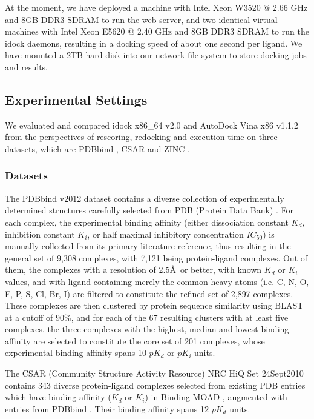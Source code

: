 \documentclass[10pt]{article}
\begin{document}
At the moment, we have deployed a machine with Intel Xeon W3520 @ 2.66 GHz and 8GB DDR3 SDRAM to run the web server, and two identical virtual machines with Intel Xeon E5620 @ 2.40 GHz and 8GB DDR3 SDRAM to run the idock daemons, resulting in a docking speed of about one second per ligand. We have mounted a 2TB hard disk into our network file system to store docking jobs and results.

\subsection*{Experimental Settings}
We evaluated and compared idock x86\_64 v2.0 and AutoDock Vina x86 v1.1.2 from the perspectives of rescoring, redocking and execution time on three datasets, which are PDBbind \cite{529,530}, CSAR \cite{857,960} and ZINC \cite{532,1178}.

\subsubsection*{Datasets}
The PDBbind v2012 dataset contains a diverse collection of experimentally determined structures carefully selected from PDB (Protein Data Bank) \cite{540,537}. For each complex, the experimental binding affinity (either dissociation constant $K_d$, inhibition constant $K_i$, or half maximal inhibitory concentration $IC_{50}$) is manually collected from its primary literature reference, thus resulting in the general set of 9,308 complexes, with 7,121 being protein-ligand complexes. Out of them, the complexes with a resolution of 2.5\AA\ or better, with known $K_d$ or $K_i$ values, and with ligand containing merely the common heavy atoms (i.e. C, N, O, F, P, S, Cl, Br, I) are filtered to constitute the refined set of 2,897 complexes. These complexes are then clustered by protein sequence similarity using BLAST at a cutoff of 90\%, and for each of the 67 resulting clusters with at least five complexes, the three complexes with the highest, median and lowest binding affinity are selected to constitute the core set of 201 complexes, whose experimental binding affinity spans 10 $pK_d$ or $pK_i$ units.

The CSAR (Community Structure Activity Resource) NRC HiQ Set 24Sept2010 contains 343 diverse protein-ligand complexes selected from existing PDB \cite{540,537} entries which have binding affinity ($K_d$ or $K_i$) in Binding MOAD \cite{517,518}, augmented with entries from PDBbind \cite{529,530}. Their binding affinity spans 12 $pK_d$ units.
\end{document}
